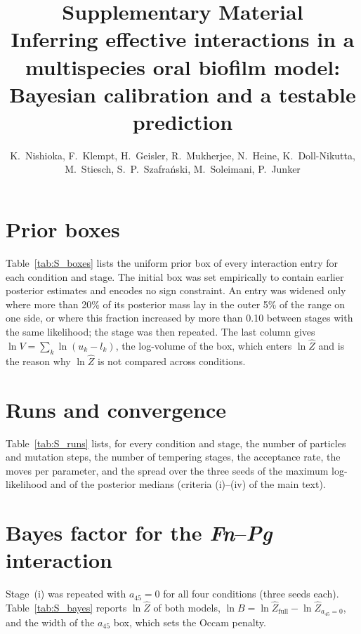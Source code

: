 \documentclass[11pt,a4paper]{article}
\title{Supplementary Material\\[4pt]
\large Inferring effective interactions in a multispecies oral biofilm model:\\ Bayesian calibration and a testable prediction}
\author{K.~Nishioka, F.~Klempt, H.~Geisler, R.~Mukherjee, N.~Heine, K.~Doll-Nikutta,\\ M.~Stiesch, S.~P.~Szafra\'{n}ski, M.~Soleimani, P.~Junker}
\date{}
\begin{document}
\maketitle

\section{Prior boxes}
\label{sec:S_boxes}
Table~\ref{tab:S_boxes} lists the uniform prior box of every interaction entry for each condition and stage.
The initial box was set empirically to contain earlier posterior estimates and encodes no sign constraint.
An entry was widened only where more than 20\% of its posterior mass lay in the outer 5\% of the range on one side, or where this fraction increased by more than 0.10 between stages with the same likelihood; the stage was then repeated.
The last column gives $\ln V=\sum_k\ln(u_k-l_k)$, the log-volume of the box, which enters $\ln\hat Z$ and is the reason why $\ln\hat Z$ is not compared across conditions.

\begin{table}[h]
\centering
\caption{Prior boxes per condition and stage for the 15 free entries; entries widened relative to stage (i) in bold. Stage (iv) uses the stage-(iii) posterior mean $\pm4$\,SD, clipped to the stage-(iii) box. $\ln V=\sum_k\ln(u_k-l_k)$ over the free entries.}
\label{tab:S_boxes}
\small
\end{table}

\section{Runs and convergence}
\label{sec:S_runs}
Table~\ref{tab:S_runs} lists, for every condition and stage, the number of particles and mutation steps, the number of tempering stages, the acceptance rate, the moves per parameter, and the spread over the three seeds of the maximum log-likelihood and of the posterior medians (criteria (i)--(iv) of the main text).

\begin{table}[h]
\centering
\caption{Runs of the final pipeline: particles $N_p$, mutation steps $K$, tempering stages, acceptance rate, moves per free parameter, maximum log-likelihood (best seed; spread over three seeds in parentheses) and wall-clock hours per seed.}
\label{tab:S_runs}
\small
\end{table}

\section{Bayes factor for the \textit{Fn}--\textit{Pg} interaction}
\label{sec:S_bayes}
Stage~(i) was repeated with $a_{45}=0$ for all four conditions (three seeds each).
Table~\ref{tab:S_bayes} reports $\ln\hat Z$ of both models, $\ln B=\ln\hat Z_{\mathrm{full}}-\ln\hat Z_{a_{45}=0}$, and the width of the $a_{45}$ box, which sets the Occam penalty.
\end{document}
